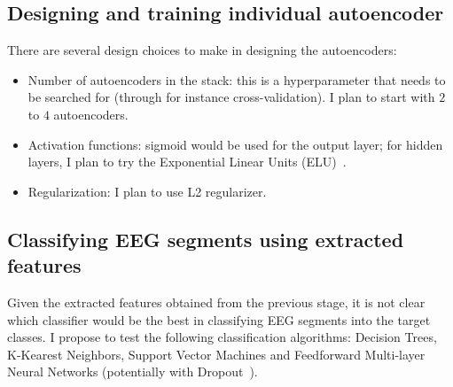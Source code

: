 \documentclass[12pt]{article}
\begin{document}
\subsection{Designing and training individual autoencoder}

There are several design choices to make in designing the autoencoders:
\begin{itemize}
\item Number of autoencoders in the stack: this is a hyperparameter that needs to be searched for (through for instance cross-validation). I plan to start with $2$ to $4$ autoencoders.
\item Activation functions: sigmoid would be used for the output layer; for hidden layers, I plan to try the Exponential Linear Units (ELU)~\cite{clevert2015fast}.
\item Regularization: I plan to use L2 regularizer.
\end{itemize}

\subsection{Classifying EEG segments using extracted features}

Given the extracted features obtained from the previous stage, it is not clear which classifier would be the best in classifying EEG segments into the target classes. I propose to test the following classification algorithms: Decision Trees, K-Kearest Neighbors, Support Vector Machines and Feedforward Multi-layer Neural Networks (potentially with Dropout~\cite{srivastava2014dropout}).




\end{document}
